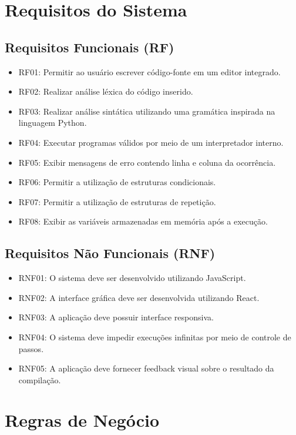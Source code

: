 \documentclass[a4paper,12pt]{article}
\begin{document}
\section{Requisitos do Sistema}

\subsection{Requisitos Funcionais (RF)}

\begin{itemize}
    \item RF01: Permitir ao usuário escrever código-fonte em um editor integrado.
    \item RF02: Realizar análise léxica do código inserido.
    \item RF03: Realizar análise sintática utilizando uma gramática inspirada na linguagem Python.
    \item RF04: Executar programas válidos por meio de um interpretador interno.
    \item RF05: Exibir mensagens de erro contendo linha e coluna da ocorrência.
    \item RF06: Permitir a utilização de estruturas condicionais.
    \item RF07: Permitir a utilização de estruturas de repetição.
    \item RF08: Exibir as variáveis armazenadas em memória após a execução.
\end{itemize}

\subsection{Requisitos Não Funcionais (RNF)}

\begin{itemize}
    \item RNF01: O sistema deve ser desenvolvido utilizando JavaScript.
    \item RNF02: A interface gráfica deve ser desenvolvida utilizando React.
    \item RNF03: A aplicação deve possuir interface responsiva.
    \item RNF04: O sistema deve impedir execuções infinitas por meio de controle de passos.
    \item RNF05: A aplicação deve fornecer feedback visual sobre o resultado da compilação.
\end{itemize}

\section{Regras de Negócio}
\end{document}
